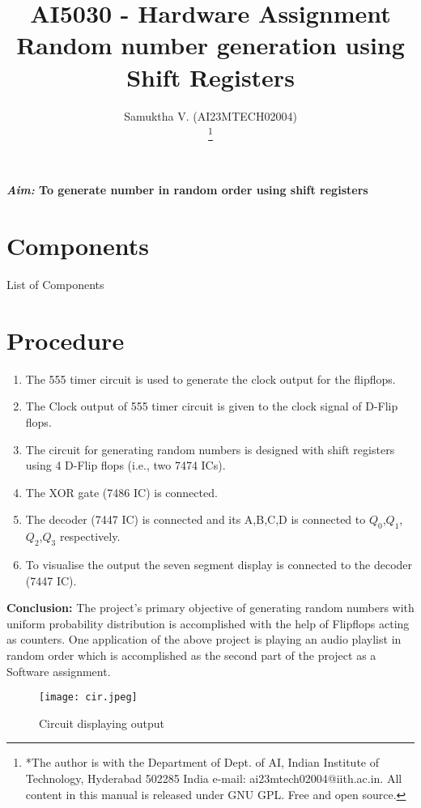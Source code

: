 \documentclass[journal,12pt,twocolumn]{IEEEtran}
\begin{document}
\vspace{3cm}

\title{
AI5030 - Hardware Assignment\\
Random number generation using Shift Registers%
}
\author{ Samuktha V. (AI23MTECH02004)

	\thanks{*The author is with the Department
		of Dept. of AI, Indian Institute of Technology, Hyderabad
		502285 India e-mail:  ai23mtech02004@iith.ac.in. All content in this manual is released under GNU GPL.  Free and open source.}
}

\maketitle

\newpage
\textbf{\emph{Aim:} To generate number in random order using shift registers}
\newline

\section{Components }
\begin{table}[htbp]
	\label{tab:Hardware_Assignment}
	
	\caption{List of Components}
\end{table}



\section{Procedure}
\begin{enumerate}[label=(\roman*)]
	\item The 555 timer circuit is used to generate the clock output for the flipflops.
	\item The Clock output of 555 timer circuit is given to the clock signal of D-Flip flops.
	\item The circuit for generating random numbers is designed with shift registers using  4 D-Flip flops (i.e., two 7474 ICs).
	\item The XOR gate (7486 IC) is connected.
	\item The decoder (7447 IC) is connected and its A,B,C,D is connected to $Q_0$,$Q_1$,$Q_2$,$Q_3$ respectively.
	\item To visualise the output the seven segment display is connected to the decoder (7447 IC).
\end{enumerate}

\textbf{Conclusion:} 
The project's primary objective of generating random numbers with uniform probability distribution is accomplished with the help of Flipflops acting as counters.
One application of the above project is playing an audio playlist in random order which is accomplished as the second part of the project as a Software assignment.
\begin{figure}[h]
    \centering
    \texttt{[image: cir.jpeg]}
    \caption{Circuit displaying output}
    \label{fig:my_label}
\end{figure}
\end{document}

